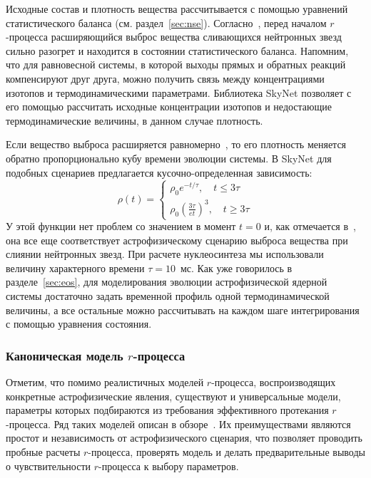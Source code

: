 Исходные состав и плотность вещества рассчитывается с помощью уравнений статистического баланса (см. раздел~\ref{sec:nse}). Согласно~\cite{goriely2011,korobkin2012,theilemann2017}, перед началом $r$-процесса расширяющийся выброс вещества сливающихся нейтронных звезд сильно разогрет и находится в состоянии статистического баланса. Напомним, что для равновесной системы, в которой выходы прямых и обратных реакций компенсируют друг друга, можно получить связь между концентрациями изотопов и термодинамическими параметрами. Библиотека SkyNet позволяет с его помощью рассчитать исходные концентрации изотопов и недостающие термодинамические величины, в данном случае плотность.

Если вещество выброса расширяется равномерно~\cite{korobkin2012,lippuner2015}, то его плотность меняется обратно пропорционально кубу времени эволюции системы. В SkyNet для подобных сценариев предлагается кусочно-определенная зависимость:
\begin{equation}
\displaystyle
\rho(t) = \begin{cases}
\rho_0 e^{-t/\tau}, \quad t \leq 3\tau\\
\rho_0 \left( \frac{3\tau}{et} \right)^3, \quad t \geq 3\tau
\end{cases}
\end{equation}
У этой функции нет проблем со значением в момент $t=0$ и, как отмечается в~\cite{lippuner2015}, она все еще соответствует астрофизическому сценарию выброса вещества при слиянии нейтронных звезд. При расчете нуклеосинтеза мы использовали величину характерного времени $\tau = 10$~мс. Как уже говорилось в разделе~\ref{sec:eos}, для моделирования эволюции астрофизической ядерной системы достаточно задать временной профиль одной термодинамической величины, а все остальные можно рассчитывать на каждом шаге интегрирования с помощью уравнения состояния.

\subsubsection{Каноническая модель $r$-процесса}
Отметим, что помимо реалистичных моделей $r$-процесса, воспроизводящих конкретные астрофизические явления, существуют и универсальные модели, параметры которых подбираются из требования эффективного протекания $r$-процесса. Ряд таких моделей описан в обзоре~\cite{arnould2007}. Их преимуществами являются простот и независимость от астрофизического сценария, что позволяет проводить пробные расчеты $r$-процесса, проверять модель и делать предварительные выводы о чувствительности $r$-процесса к выбору параметров.

